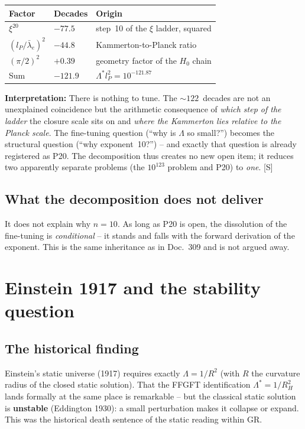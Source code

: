 \documentclass[11pt]{report}
\begin{document}
\begin{center}
\begin{tabular}{lll}
\toprule
Factor & Decades & Origin \\
\midrule
$\xi^{20}$ & $-77.5$ & step~10 of the $\xi$ ladder, squared \\
$(l_P/\bar\lambda_e)^2$ & $-44.8$ & Kammerton-to-Planck ratio \\
$(\pi/2)^2$ & $+0.39$ & geometry factor of the $H_0$ chain \\
\midrule
Sum & $-121.9$ & $\Lambda^{*}l_P^2 = 10^{-121.87}$ \\
\bottomrule
\end{tabular}
\end{center}

\textbf{Interpretation:} There is nothing to tune. The
$\sim\!122$~decades are not an unexplained coincidence but the
arithmetic consequence of \emph{which step of the ladder} the
closure scale sits on and \emph{where the Kammerton lies relative
to the Planck scale}. The fine-tuning question
(\enquote{why is $\Lambda$ so small?}) becomes the structural
question (\enquote{why exponent~10?}) -- and exactly that question
is already registered as P20. The decomposition thus creates no new
open item; it reduces two apparently separate problems (the
$10^{123}$ problem and P20) to \emph{one}. [S]

\section{What the decomposition does not deliver}

It does not explain why $n=10$. As long as P20 is open, the
dissolution of the fine-tuning is \emph{conditional} -- it stands
and falls with the forward derivation of the exponent. This is the
same inheritance as in Doc.~309 and is not argued away.

\chapter{Einstein 1917 and the stability question}

\section{The historical finding}

Einstein's static universe (1917) requires exactly
$\Lambda = 1/R^2$ (with $R$ the curvature radius of the closed
static solution). That the FFGFT identification
$\Lambda^{*} = 1/R_H^2$ lands formally at the same place is
remarkable -- but the classical static solution is
\textbf{unstable} (Eddington 1930): a small perturbation makes it
collapse or expand. This was the historical death sentence of the
static reading within GR.
\end{document}

